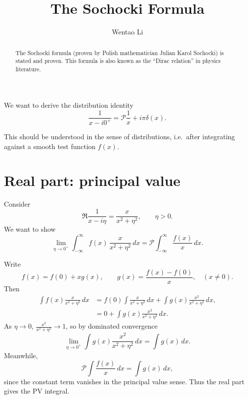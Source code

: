 \documentclass{article}
\author{Wentao Li}
\theoremstyle{definition}
\theoremstyle{plain}
\numberwithin{equation}{section}
\begin{document}
    
\title{The Sochocki Formula}

\maketitle

\begin{abstract}
    The Sochocki formula (proven by 
    Polish mathematician Julian Karol Sochocki) 
    is stated and proven. 
    This formula is also known as the 
    ``Dirac relation'' in physics literature.
\end{abstract}

We want to derive the distribution identity
\begin{equation}
\frac{1}{x-i0^+} = \mathcal{P}\frac{1}{x} + i\pi \delta(x).
\end{equation}

This should be understood in the sense of distributions, i.e.\ after integrating against a smooth test function $f(x)$.

\section{Real part: principal value}

Consider
\begin{equation}
\Re \frac{1}{x-i\eta} = \frac{x}{x^{2}+\eta^{2}}, \qquad \eta > 0.
\end{equation}
We want to show
\begin{equation}
\lim_{\eta\to0^+}\int_{-\infty}^{\infty} f(x)\,\frac{x}{x^2+\eta^2}\,dx
= \mathcal{P}\int_{-\infty}^{\infty}\frac{f(x)}{x}\,dx.
\end{equation}

Write
\begin{equation}
f(x)=f(0)+x g(x), \qquad g(x)=\frac{f(x)-f(0)}{x}, \quad (x\neq 0).
\end{equation}
Then
\begin{align}
\int f(x)\frac{x}{x^2+\eta^2}\,dx
&= f(0)\int \frac{x}{x^2+\eta^2}\,dx + \int g(x)\frac{x^2}{x^2+\eta^2}\,dx, \\
&= 0 + \int g(x)\frac{x^2}{x^2+\eta^2}\,dx.
\end{align}
As $\eta \to 0$, $\frac{x^2}{x^2+\eta^2} \to 1$, so by dominated convergence
\begin{equation}
\lim_{\eta\to0^+}\int g(x)\frac{x^2}{x^2+\eta^2}\,dx = \int g(x)\,dx.
\end{equation}
Meanwhile,
\begin{equation}
\mathcal{P}\int \frac{f(x)}{x}\,dx = \int g(x)\,dx,
\end{equation}
since the constant term vanishes in the principal value sense. Thus the real part gives the PV integral.
\end{document}
